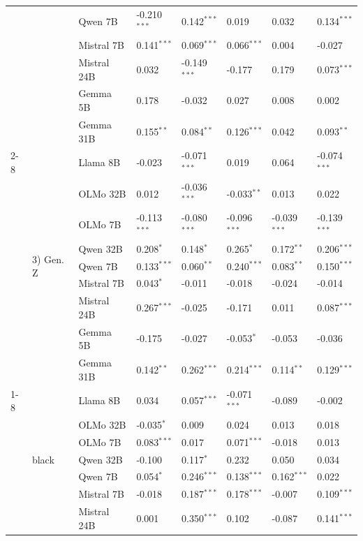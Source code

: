 \begin{longtable}[t]{llllllll}
 &  & Qwen 7B & -0.210$^{***}$ & 0.142$^{***}$ & 0.019 & 0.032 & 0.134$^{***}$ \\
 &  & Mistral 7B & 0.141$^{***}$ & 0.069$^{***}$ & 0.066$^{***}$ & 0.004 & -0.027 \\
 &  & Mistral 24B & 0.032 & -0.149$^{***}$ & -0.177 & 0.179 & 0.073$^{***}$ \\
 &  & Gemma 5B & 0.178 & -0.032 & 0.027 & 0.008 & 0.002 \\
 &  & Gemma 31B & 0.155$^{**}$ & 0.084$^{**}$ & 0.126$^{***}$ & 0.042 & 0.093$^{**}$ \\
\cline{2-8}
 & \multirow[t]{9}{*}{3) Gen. Z} & Llama 8B & -0.023 & -0.071$^{***}$ & 0.019 & 0.064 & -0.074$^{***}$ \\
 &  & OLMo 32B & 0.012 & -0.036$^{***}$ & -0.033$^{**}$ & 0.013 & 0.022 \\
 &  & OLMo 7B & -0.113$^{***}$ & -0.080$^{***}$ & -0.096$^{***}$ & -0.039$^{***}$ & -0.139$^{***}$ \\
 &  & Qwen 32B & 0.208$^{*}$ & 0.148$^{*}$ & 0.265$^{*}$ & 0.172$^{**}$ & 0.206$^{***}$ \\
 &  & Qwen 7B & 0.133$^{***}$ & 0.060$^{**}$ & 0.240$^{***}$ & 0.083$^{**}$ & 0.150$^{***}$ \\
 &  & Mistral 7B & 0.043$^{*}$ & -0.011 & -0.018 & -0.024 & -0.014 \\
 &  & Mistral 24B & 0.267$^{***}$ & -0.025 & -0.171 & 0.011 & 0.087$^{***}$ \\
 &  & Gemma 5B & -0.175 & -0.027 & -0.053$^{*}$ & -0.053 & -0.036 \\
 &  & Gemma 31B & 0.142$^{**}$ & 0.262$^{***}$ & 0.214$^{***}$ & 0.114$^{**}$ & 0.129$^{***}$ \\
\cline{1-8} \cline{2-8}
\multirow[t]{45}{*}{Ethnicity} & \multirow[t]{9}{*}{black} & Llama 8B & 0.034 & 0.057$^{***}$ & -0.071$^{***}$ & -0.089 & -0.002 \\
 &  & OLMo 32B & -0.035$^{*}$ & 0.009 & 0.024 & 0.013 & 0.018 \\
 &  & OLMo 7B & 0.083$^{***}$ & 0.017 & 0.071$^{***}$ & -0.018 & 0.013 \\
 &  & Qwen 32B & -0.100 & 0.117$^{*}$ & 0.232 & 0.050 & 0.034 \\
 &  & Qwen 7B & 0.054$^{*}$ & 0.246$^{***}$ & 0.138$^{***}$ & 0.162$^{***}$ & 0.022 \\
 &  & Mistral 7B & -0.018 & 0.187$^{***}$ & 0.178$^{***}$ & -0.007 & 0.109$^{***}$ \\
 &  & Mistral 24B & 0.001 & 0.350$^{***}$ & 0.102 & -0.087 & 0.141$^{***}$ \\

\end{longtable}
